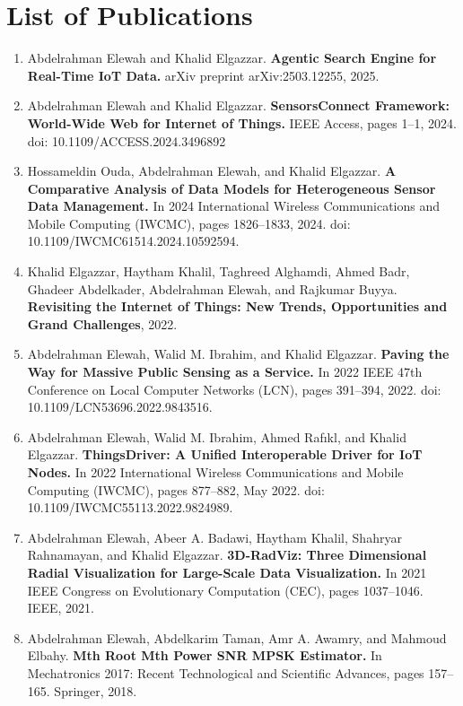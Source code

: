 \documentclass[10pt, letterpaper]{article}
\begin{document}
\vspace{-.4cm}
    
    
    \section{List of  Publications}

\begin{enumerate}[label={}]
    \item \cite{elewah2025agentic} Abdelrahman Elewah and Khalid Elgazzar. \textbf{Agentic Search Engine for Real-Time IoT Data.} arXiv preprint arXiv:2503.12255, 2025.
    
    \item \cite{SensorsConnect} Abdelrahman Elewah and Khalid Elgazzar. \textbf{SensorsConnect Framework: World-Wide Web for Internet of Things.} IEEE Access, pages 1–1, 2024. doi: 10.1109/ACCESS.2024.3496892

    \item \cite{Hossam2024} Hossameldin Ouda, Abdelrahman Elewah, and Khalid Elgazzar. \textbf{A Comparative Analysis of Data Models for Heterogeneous Sensor Data Management.} In 2024 International Wireless Communications and Mobile Computing (IWCMC), pages 1826–1833, 2024. doi: 10.1109/IWCMC61514.2024.10592594.

    \item \cite{elgazzar2022revisiting} Khalid Elgazzar, Haytham Khalil, Taghreed Alghamdi, Ahmed Badr, Ghadeer Abdelkader, Abdelrahman Elewah, and Rajkumar Buyya. \textbf{Revisiting the Internet of Things: New Trends, Opportunities and Grand Challenges}, 2022.

    \item \cite{PSaaS} Abdelrahman Elewah, Walid M. Ibrahim, and Khalid Elgazzar. \textbf{Paving the Way for Massive Public Sensing as a Service.} In 2022 IEEE 47th Conference on Local Computer Networks (LCN), pages 391–394, 2022. doi: 10.1109/LCN53696.2022.9843516.

    \item \cite{ThingsDriver} Abdelrahman Elewah, Walid M. Ibrahim, Ahmed Rafıkl, and Khalid Elgazzar. \textbf{ThingsDriver: A Unified Interoperable Driver for IoT Nodes.} In 2022 International Wireless Communications and Mobile Computing (IWCMC), pages 877–882, May 2022. doi: 10.1109/IWCMC55113.2022.9824989.

    \item \cite{elewah20213d} Abdelrahman Elewah, Abeer A. Badawi, Haytham Khalil, Shahryar Rahnamayan, and Khalid Elgazzar. \textbf{3D-RadViz: Three Dimensional Radial Visualization for Large-Scale Data Visualization.} In 2021 IEEE Congress on Evolutionary Computation (CEC), pages 1037–1046. IEEE, 2021.

    \item \cite{elewah2018mth} Abdelrahman Elewah, Abdelkarim Taman, Amr A. Awamry, and Mahmoud Elbahy. \textbf{Mth Root Mth Power SNR MPSK Estimator.} In Mechatronics 2017: Recent Technological and Scientific Advances, pages 157–165. Springer, 2018.
\end{enumerate}
\end{document}
